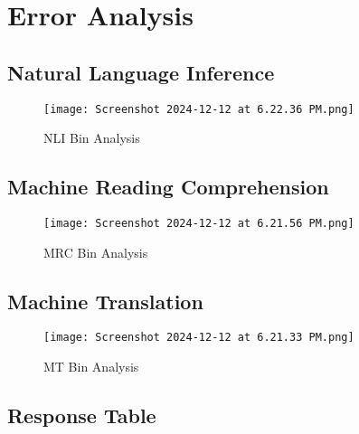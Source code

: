 \section{Error Analysis}

\subsection{Natural Language Inference}

\begin{figure}[h]
    \centering
    \texttt{[image: Screenshot 2024-12-12 at 6.22.36 PM.png]}
    \caption{NLI Bin Analysis}
    \label{fig:enter-label}
\end{figure}

\subsection{Machine Reading Comprehension}

\begin{figure}[h]
    \centering
    \texttt{[image: Screenshot 2024-12-12 at 6.21.56 PM.png]}
    \caption{MRC Bin Analysis}
    \label{fig:enter-label}
\end{figure}

\subsection{Machine Translation}

\begin{figure}[h]
    \centering
    \texttt{[image: Screenshot 2024-12-12 at 6.21.33 PM.png]}
    \caption{MT Bin Analysis}
    \label{fig:enter-label}
\end{figure}

\clearpage

\subsection{Response Table}

